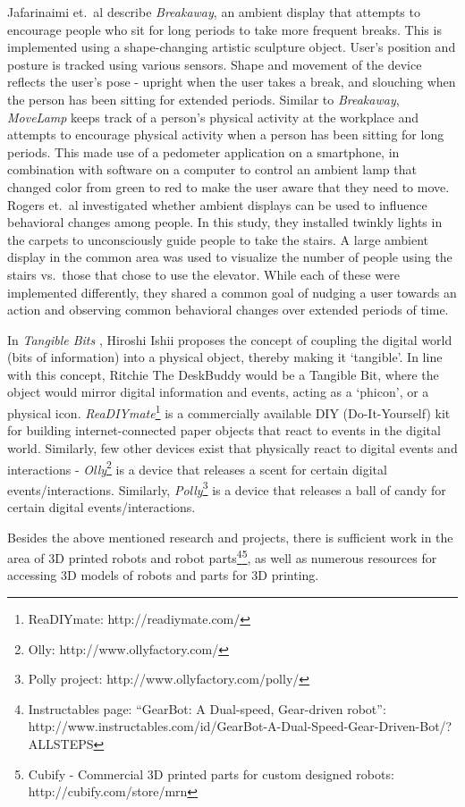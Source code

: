 \documentclass{sigchi-ext}
\begin{document}
Jafarinaimi et.\ al \cite{jafarinaimi2005breakaway} describe
\textit{Breakaway}, an ambient display that attempts to encourage people who
sit for long periods to take more frequent breaks. This is implemented using a
shape-changing artistic sculpture object. User's position and posture is
tracked using various sensors. Shape and movement of the device reflects the
user's pose - upright when the user takes a break, and slouching when the
person has been sitting for extended periods. Similar to \textit{Breakaway},
\textit{MoveLamp} \cite{fortmann2013make} keeps track of a person's physical
activity at the workplace and attempts to encourage physical activity when a
person has been sitting for long periods. This made use of a pedometer
application on a smartphone, in combination with software on a computer to
control an ambient lamp that changed color from green to red to make the user
aware that they need to move. Rogers et.\ al \cite{rogers2010ambient}
investigated whether ambient displays can be used to influence behavioral
changes among people. In this study, they installed twinkly lights in the
carpets to unconsciously guide people to take the stairs. A large ambient
display in the common area was used to visualize the number of people using the
stairs vs.\ those that chose to use the elevator. While each of these were
implemented differently, they shared a common goal of nudging a user towards an
action and observing common behavioral changes over extended periods of time.

In \textit{Tangible Bits} \cite{ishii1997tangible}, Hiroshi Ishii proposes the
concept of coupling the digital world (bits of information) into a physical
object, thereby making it `tangible'. In line with this concept, Ritchie The
DeskBuddy would be a Tangible Bit, where the object would mirror digital
information and events, acting as a `phicon', or a physical icon.
\textit{ReaDIYmate}\footnote{ReaDIYmate: http://readiymate.com/} is a
commercially available DIY (Do-It-Yourself) kit for building internet-connected
paper objects that react to events in the digital world.  Similarly, few other
devices exist that physically react to digital events and interactions -
\textit{Olly}\footnote{Olly: http://www.ollyfactory.com/} is a device that
releases a scent for certain digital events/interactions. Similarly,
\textit{Polly}\footnote{Polly project: http://www.ollyfactory.com/polly/} is a
device that releases a ball of candy for certain digital events/interactions.

Besides the above mentioned research and projects, there is sufficient work in
the area of 3D printed robots and robot parts\cite{megaro2015interactive,
schulz2015interactive}\footnote{Instructables page: ``GearBot: A Dual-speed,
Gear-driven robot'':
http://www.instructables.com/id/GearBot-A-Dual-Speed-Gear-Driven-Bot/?ALLSTEPS}\footnote{Cubify
- Commercial 3D printed parts for custom designed robots:
http://cubify.com/store/mrn}, as well as numerous resources for accessing 3D
models of robots and parts for 3D printing.
\end{document}
